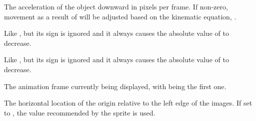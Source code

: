 \documentclass[letterpaper,10pt,english]{sphinxmanual}
\begin{document}
\begin{fulllineitems}

\begin{fulllineitems}
\label{dsp:sge.dsp.Object.yacceleration}
The acceleration of the object downward in pixels per frame.  If
non-zero, movement as a result of {\hyperref[dsp:sge.dsp.Object.yvelocity]{\emph{}}} will be
adjusted based on the kinematic equation,
.

\end{fulllineitems}


\begin{fulllineitems}
\label{dsp:sge.dsp.Object.xdeceleration}
Like {\hyperref[dsp:sge.dsp.Object.xacceleration]{\emph{}}}, but its sign is ignored and it always
causes the absolute value of {\hyperref[dsp:sge.dsp.Object.xvelocity]{\emph{}}} to decrease.

\end{fulllineitems}


\begin{fulllineitems}
\label{dsp:sge.dsp.Object.ydeceleration}
Like {\hyperref[dsp:sge.dsp.Object.yacceleration]{\emph{}}}, but its sign is ignored and it always
causes the absolute value of {\hyperref[dsp:sge.dsp.Object.yvelocity]{\emph{}}} to decrease.

\end{fulllineitems}


\begin{fulllineitems}
\label{dsp:sge.dsp.Object.image_index}
The animation frame currently being displayed, with  being
the first one.

\end{fulllineitems}


\begin{fulllineitems}
\label{dsp:sge.dsp.Object.image_origin_x}
The horizontal location of the origin relative to the left edge
of the images.  If set to , the value recommended by
the sprite is used.


\end{fulllineitems}
\end{fulllineitems}
\end{document}
